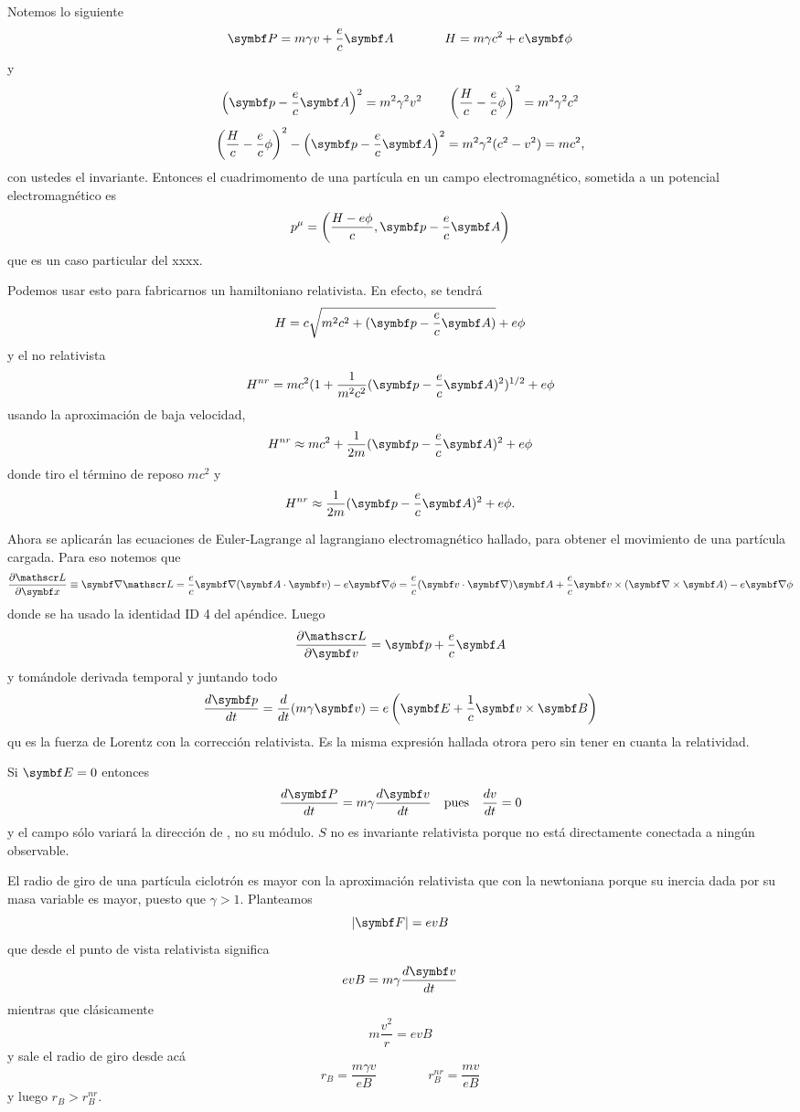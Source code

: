\documentclass[10pt,oneside]{CBFT_book}
\begin{document}
Notemos lo siguiente
\[
	\vb{P} = m \gamma v + \frac{e}{c} \vb{A} \qquad \qquad H = m \gamma c^2 + e \vb{\phi}
\]
y
\[
	\left( \vb{p} - \frac{e}{c}\vb{A} \right)^2 = m^2 \gamma^2 v^2 \qquad 
	\left( \frac{H}{c} - \frac{e}{c}\phi \right)^2 = m^2 \gamma^2 c^2
\]
\[
	\left( \frac{H}{c} - \frac{e}{c}\phi \right)^2 - \left( \vb{p} - \frac{e}{c}\vb{A} \right)^2 =
	m^2 \gamma^2 ( c^2 - v^2 ) = mc^2,
\]
con ustedes el invariante. Entonces el cuadrimomento de una partícula en un campo electromagnético,
sometida a un potencial electromagnético es 
\[
	p^\mu = \left( \frac{H-e\phi}{c}, \vb{p} - \frac{e}{c}\vb{A} \right)
\]
que es un caso particular del xxxx.

Podemos usar esto para fabricarnos un hamiltoniano relativista.
En efecto, se tendrá
\[
	H = c \sqrt{ m^2 c^2 + ( \vb{p} - \frac{e}{c}\vb{A} )} + e \phi
\]
y el no relativista
\[
	H^{nr} = m c^2 ( 1 + \frac{1}{m^2 c^2}(\vb{p} - \frac{e}{c}\vb{A} )^2 )^{1/2} + e \phi
\]
usando la aproximación de baja velocidad,
\[
	H^{nr} \approx m c^2 + \frac{1}{2m} ( \vb{p} - \frac{e}{c}\vb{A} )^2 + e \phi
\]
donde tiro el término de reposo $mc^2$ y
\[
	H^{nr} \approx \frac{1}{2m} ( \vb{p} - \frac{e}{c}\vb{A} )^2 + e \phi.
\]

Ahora se aplicarán las ecuaciones de Euler-Lagrange al lagrangiano electromagnético hallado, para
obtener el movimiento de una partícula cargada. Para eso notemos que
\[
	\dpar{\Lag}{\vbx} \equiv 
	\Nabla \Lag = \frac{e}{c} \Nabla (\pe{A}{v}) - e \Nabla \phi =
	\frac{e}{c} (\vb{v}\cdot\Nabla) \vb{A} + \frac{e}{c} \vb{v} \times(\rotorm{A}) - e \Nabla \phi
\]
donde se ha usado la identidad ID 4 del apéndice. Luego
\[
	\dpar{\Lag}{\vb{v}} = \vb{p} + \frac{e}{c}\vb{A}
\]
y tomándole derivada temporal y juntando todo
\[
	\dtot{\vb{p}}{t} = \dtot{}{t}(m\gamma\vb{v}) = e \left(  \vb{E} + \frac{1}{c}\pv{v}{B} \right)
\]
qu es la fuerza de Lorentz con la corrección relativista. Es la misma expresión hallada otrora pero
sin tener en cuanta la relatividad.

Si $\vb{E}=0$ entonces 
\[
	\dtot{\vb{P}}{t} = m \gamma \dtot{\vb{v}}{t} \quad \text{pues} \quad \dtot{v}{t} = 0 
\]
y el campo  sólo variará la dirección de , no su módulo.
$S$ no es invariante relativista porque no está directamente conectada a ningún observable.

El radio de giro de una partícula ciclotrón es mayor con la aproximación relativista que con la newtoniana
porque su inercia dada por su masa variable es mayor, puesto que $\gamma > 1$. Planteamos
\[
	|\vb{F}| = e v B
\]
que desde el punto de vista relativista significa
\[
	e v B =  m \gamma \dtot{\vb{v}}{t}
\]
mientras que clásicamente 
\[
	m \frac{v^2}{r} = e v B 
\]
y sale el radio de giro desde acá
\[
	r_B = \frac{m\gamma v}{eB} \qquad\qquad r_B^{nr} = \frac{m v}{eB}
\]
y luego $ r_B > r_B^{nr}$.
\end{document}
